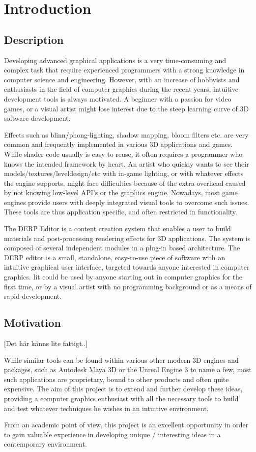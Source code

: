 \chapter{Introduction}
 
 \section{Description}
Developing advanced graphical applications is a very time-consuming and complex task that require experienced programmers with a strong knowledge in computer science and engineering. However, with an increase of hobbyists and enthusiasts in the field of computer graphics during the recent years, intuitive development tools is always motivated. A beginner with a passion for video games, or a visual artist might lose interest due to the steep learning curve of 3D software development.

Effects such as blinn/phong-lighting, shadow mapping, bloom filters etc. are very common and frequently implemented in various 3D applications and games. While shader code usually is easy to reuse, it often requires a programmer who knows the intended framework by heart. An artist who quickly wants to see their models/textures/leveldesign/etc with in-game lighting, or with whatever effects the engine supports, might face difficulties because of the extra overhead caused by not knowing low-level API's or the graphics engine. Nowadays, most game engines provide users with deeply integrated visual tools to overcome such issues. These tools are thus application specific, and often restricted in functionality. 

The DERP Editor is a content creation system that enables a user to build materials and post-processing rendering effects for 3D applications. The system is composed of several independent modules in a plug-in based architecture. The DERP editor is a small, standalone, easy-to-use piece of software with an intuitive graphical user interface, targeted towards anyone interested in computer graphics. Iit could be used by anyone starting out in computer graphics for the first time, or by a visual artist with no programming background or as a means of rapid development. 

\section{Motivation}
[Det här känns lite fattigt..]

While similar tools can be found within various other modern 3D engines and packages, such as Autodesk Maya 3D or the Unreal Engine 3 to name a few, most such applications are proprietary, bound to other products and often quite expensive. The aim of this project is to extend and further develop these ideas, providing a computer graphics enthusiast with all the necessary tools to build and test whatever techniques he wishes in an intuitive environment. 
 
From an academic point of view, this project is an excellent opportunity in order to gain valuable experience in developing unique / interesting ideas in a contemporary environment. 
 
